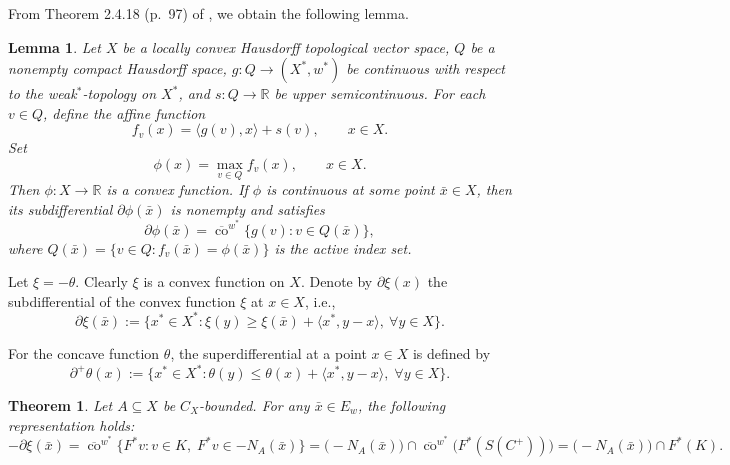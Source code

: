 \documentclass[10pt,a4paper]{amsart}
\newtheorem{theorem}{Theorem}[section]
\newtheorem{lemma}{Lemma}[section]
\begin{document}
 

From  Theorem 2.4.18 (p.~97) of \cite{Zalinescu2002}, we obtain the following lemma.

 



\begin{lemma}\label{ITDL}
	Let   $X$ be a locally convex Hausdorff topological vector space,  $Q$ be a nonempty compact Hausdorff space,  $g: Q \to (X^*, w^*)$ be continuous with respect to the weak$^*$-topology on $X^*$,  and $s: Q \to \mathbb{R}$ be upper semicontinuous.
 	For each $v \in Q$, define the affine function
	\[
	f_v(x) = \langle g(v), x \rangle + s(v), \qquad x \in X.
	\]
	Set
	\[
	\phi(x) = \max_{v \in Q} f_v(x), \qquad x \in X.
	\]
	Then $\phi: X \to \mathbb{R}$ is a convex function.  If $\phi$ is continuous at some point $\bar x \in X$, then its subdifferential $\partial \phi(\bar x)$ is nonempty and satisfies
	\[
	\partial \phi(\bar x) = \overline{\operatorname{co}}^{w^*} \{ g(v) : v \in Q(\bar x) \},
	\]
	where $Q(\bar x) = \{ v \in Q : f_v(\bar x) = \phi(\bar x) \}$ is the active index set.
\end{lemma}




Let $\xi = -\theta$. Clearly $\xi$ is a convex   function on $X$.  Denote by $\partial \xi({x})$ the subdifferential of the convex function $\xi$ at $x \in X $, i.e.,
\[
\partial \xi(\bar{x}) := \big\{ x^* \in X^* : \xi(y) \ge \xi(\bar{x}) + \langle x^*, y - x \rangle,\ \forall y \in X \big\}.
\]

For the concave function \(\theta\), the superdifferential at a point \(x\in X\) is defined by
\[
\partial^+ \theta(x):=\{x^*\in X^*:\theta(y)\le\theta(x)+\langle x^*,y-x\rangle, \; \forall y\in X\}.
\]

\begin{theorem}  \label{BSXEQ}  Let $A  \subseteq X$ be $C_X$-bounded.
 For any $\bar{x} \in E_w$, the following representation holds:
	\[
	-\partial \xi(\bar{x}) = \overline{\operatorname{co}}^{w^*} \bigl\{ F^*v : v \in K,\; F^*v \in -N_A(\bar{x}) \bigr\} = \bigl( -N_A(\bar{x}) \bigr) \cap \overline{\operatorname{co}}^{w^*} \bigl( F^*(S(C^+)) \bigr) = \bigl( -N_A(\bar{x}) \bigr) \cap F^*(K).
	\]
\end{theorem}
\end{document}
